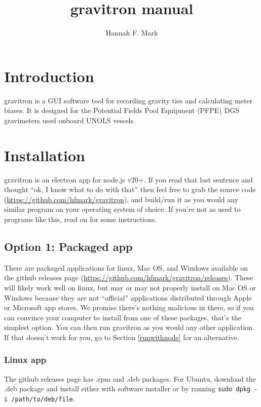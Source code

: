 \documentclass{pfpe-manual}
\title{gravitron manual}
\author{Hannah F. Mark}
\begin{document}
\maketitle

\tableofcontents
\newpage

\section{Introduction}

gravitron is a GUI software tool for recording gravity ties and calculating meter biases. It is designed for the Potential Fields Pool Equipment (PFPE) DGS gravimeters used onboard UNOLS vessels.

\section{Installation}
\label{install}
gravitron is an electron app for node.js v20+. If you read that last sentence and thought ``ok, I know what to do with that'' then feel free to grab the source code (\url{https://github.com/hfmark/gravitron}), and build/run it as you would any similar program on your operating system of choice. If you're not as used to programs like this, read on for some instructions.

\subsection{Option 1: Packaged app}
There are packaged applications for linux, Mac OS, and Windows available on the github releases page (\url{https://github.com/hfmark/gravitron/releases}). These will likely work well on linux, but may or may not properly install on Mac OS or Windows because they are not ``official'' applications distributed through Apple or Microsoft app stores. We promise there's nothing malicious in there, so if you can convince your computer to install from one of these packages, that's the simplest option. You can then run gravitron as you would any other application. If that doesn't work for you, go to Section \ref{runwithnode} for an alternative.

\subsubsection{Linux app}
The github releases page has .rpm and .deb packages. For Ubuntu, download the .deb package and install either with software installer or by running \texttt{sudo dpkg -i /path/to/deb/file}.
\end{document}
